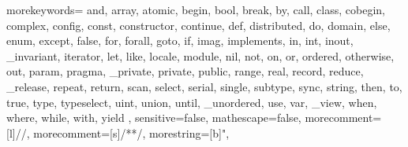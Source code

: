   {
    morekeywords={
      and, array, atomic,
      begin, bool, break, by,
      call, class, cobegin, complex, config, const, constructor, continue,
      def, distributed, do, domain,
      else, enum, except,
      false, for, forall,
      goto,
      if, imag, implements, in, int, inout, _invariant, iterator,
      let, like, locale,
      module,
      nil, not,
      on, or, ordered, otherwise, out,
      param, pragma, _private, private, public,
      range, real, record, reduce, _release, repeat, return,
      scan, select, serial, single, subtype, sync, string,
      then, to, true, type, typeselect,
      uint, union, until, _unordered, use,
      var, _view,
      when, where, while, with,
      yield
    },
    sensitive=false,
    mathescape=false,
    morecomment=[l]{//},
    morecomment=[s]{/*}{*/},
    morestring=[b]",
}


\newcommand{\chpl}[1]{\lstinline[language=chapel,basicstyle=\scriptsize\ttfamily,keywordstyle=\bfseries]!#1!}
\newcommand{\varname}[1]{\emph{#1}}
\newcommand{\typename}[1]{\emph{#1}}
\newcommand{\fnname}[1]{\chpl{#1}}



